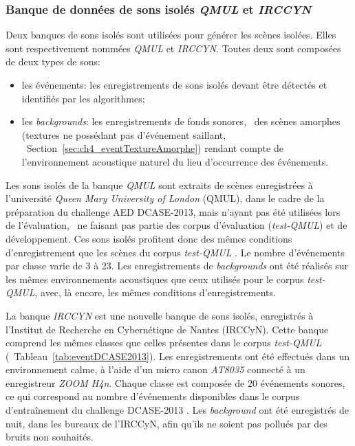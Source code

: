 \subsubsection{Banque de données de sons isolés \emph{QMUL} et \emph{IRCCYN}}
\label{sec:ch7_eventDataset}

Deux banques de sons isolés sont utilisées pour générer les scènes isolées. Elles sont respectivement nommées \emph{QMUL} et \emph{IRCCYN}. Toutes deux sont composées de deux types de sons:

\begin{itemize}
\item les événements: les enregistrements de sons isolés devant être détectés et identifiés par les algorithmes;
\item les \emph{backgrounds}: les enregistrements de fonds sonores, \ie~des scènes amorphes (textures ne possédant pas d'événement saillant, \cf~Section~\ref{sec:ch4_eventTextureAmorphe}) rendant compte de l’environnement acoustique naturel du lieu d'occurrence des événements. 
\end{itemize}

Les sons isolés de la banque \emph{QMUL} sont extraits de scènes enregistrées à l'université \emph{Queen Mary University of London} (QMUL), dans le cadre de la préparation du challenge AED DCASE-2013, mais n'ayant pas été utilisées lors de l'évaluation, \ie~ne faisant pas partie des corpus d'évaluation (\emph{test-QMUL}) et de développement. Ces sons isolés profitent donc des mêmes conditions d’enregistrement que les scènes du corpus \emph{test-QMUL} \citep{Giannoulis2013database}. Le nombre d'événements par classe varie de 3 à 23. Les enregistrements de \emph{backgrounds} ont été réalisés sur les mêmes environnements acoustiques que ceux utilisés pour le corpus \emph{test-QMUL}, avec, là encore, les mêmes conditions d'enregistrements.

La banque \emph{IRCCYN} est une nouvelle banque de sons isolés, enregistrés à l'Institut de Recherche en Cybernétique de Nantes (IRCCyN). Cette banque comprend les mêmes classes que celles présentes dans le corpus \emph{test-QMUL} (\cf~Tableau~\ref{tab:eventDCASE2013}). Les enregistrements ont été effectués dans un environnement calme, à l'aide d'un micro canon \emph{AT8035} connecté à un enregistreur \emph{ZOOM H4n}. Chaque classe est composée de 20 événements sonores, ce qui correspond au nombre d'événements disponibles dans le corpus d'entraînement du challenge DCASE-2013 \citep{Giannoulis2013database,giannoulis2013detection}. Les \emph{background} ont été enregistrés de nuit, dans les bureaux de l'IRCCyN, afin qu'ils ne soient pas pollués par des bruits non souhaités. 

